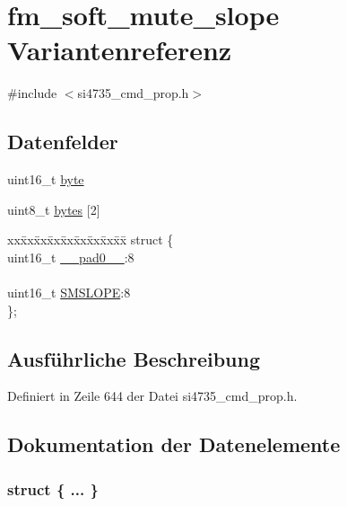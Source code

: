 \hypertarget{unionfm__soft__mute__slope}{}\section{fm\+\_\+soft\+\_\+mute\+\_\+slope Variantenreferenz}
\label{unionfm__soft__mute__slope}


{\ttfamily \#include $<$si4735\+\_\+cmd\+\_\+prop.\+h$>$}

\subsection*{Datenfelder}
\begin{DoxyCompactItemize}
\item 
uint16\+\_\+t \hyperlink{unionfm__soft__mute__slope_ab0549c1b5ea980a02e7eab77e21fea49}{byte}
\item 
uint8\+\_\+t \hyperlink{unionfm__soft__mute__slope_a46e4c05d20a047ec169f60d3167e912e}{bytes} \mbox{[}2\mbox{]}
\item 
\begin{tabbing}
xx\=xx\=xx\=xx\=xx\=xx\=xx\=xx\=xx\=\kill
struct \{\\
\>uint16\_t \hyperlink{unionfm__soft__mute__slope_a77132c2c26a75f5b8751b235cda23828}{\_\_pad0\_\_}:8\\
\>\\
\>uint16\_t \hyperlink{unionfm__soft__mute__slope_a8a31c13b7632cb2f54277566150f231c}{SMSLOPE}:8\\
\}; \\

\end{tabbing}\end{DoxyCompactItemize}


\subsection{Ausführliche Beschreibung}


Definiert in Zeile 644 der Datei si4735\+\_\+cmd\+\_\+prop.\+h.



\subsection{Dokumentation der Datenelemente}
\hypertarget{unionfm__soft__mute__slope_a1c0ee6aa484fbb1cc6fd3474042a065a}{}\subsubsection[{"@75}]{\setlength{\rightskip}{0pt plus 5cm}struct \{ ... \} }\label{unionfm__soft__mute__slope_a1c0ee6aa484fbb1cc6fd3474042a065a}
\hypertarget{unionfm__soft__mute__slope_a77132c2c26a75f5b8751b235cda23828}{}
